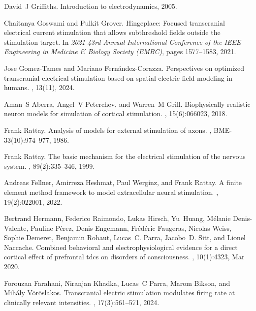\begin{thebibliography}{10}
David~J Griffiths.
\newblock Introduction to electrodynamics, 2005.

Chaitanya Goswami and Pulkit Grover.
\newblock Hingeplace: Focused transcranial electrical current stimulation that allows subthreshold fields outside the stimulation target.
\newblock In {\em 2021 43rd Annual International Conference of the IEEE Engineering in Medicine \& Biology Society (EMBC)}, pages 1577--1583, 2021.

Jose Gomez-Tames and Mariano Fern{á}ndez-Corazza.
\newblock Perspectives on optimized transcranial electrical stimulation based on spatial electric field modeling in humans.
, 13(11), 2024.

Aman~S Aberra, Angel~V Peterchev, and Warren~M Grill.
\newblock Biophysically realistic neuron models for simulation of cortical stimulation.
, 15(6):066023, 2018.

Frank Rattay.
\newblock Analysis of models for external stimulation of axons.
, BME-33(10):974--977, 1986.

Frank Rattay.
\newblock The basic mechanism for the electrical stimulation of the nervous system.
, 89(2):335--346, 1999.

Andreas Fellner, Amirreza Heshmat, Paul Werginz, and Frank Rattay.
\newblock A finite element method framework to model extracellular neural stimulation.
, 19(2):022001, 2022.

Bertrand Hermann, Federico Raimondo, Lukas Hirsch, Yu~Huang, M{\'e}lanie Denis-Valente, Pauline P{\'e}rez, Denis Engemann, Fr{\'e}d{\'e}ric Faugeras, Nicolas Weiss, Sophie Demeret, Benjamin Rohaut, Lucas~C. Parra, Jacobo~D. Sitt, and Lionel Naccache.
\newblock Combined behavioral and electrophysiological evidence for a direct cortical effect of prefrontal tdcs on disorders of consciousness.
, 10(1):4323, Mar 2020.

Forouzan Farahani, Niranjan Khadka, Lucas~C Parra, Marom Bikson, and Mih{\'a}ly V{\"o}r{\"o}slakos.
\newblock Transcranial electric stimulation modulates firing rate at clinically relevant intensities.
, 17(3):561--571, 2024.


\end{thebibliography}
